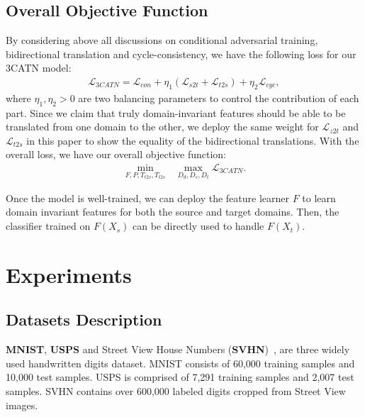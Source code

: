 \documentclass[sigconf]{acmart}
\begin{document}
\subsection{Overall Objective Function}
By considering above all discussions on conditional adversarial training, bidirectional translation and cycle-consistency, we have the following loss for our 3CATN model:
\begin{equation}
\label{eq:loss}
  \begin{array}{l}
 \mathcal{L}_{3CATN}= \mathcal{L}_{con}+\eta_1(\mathcal{L}_{s2t}+\mathcal{L}_{t2s})+\eta_2\mathcal{L}_{cyc},
\end{array} 
\end{equation} 
where $\eta_1, \eta_2>0$ are two balancing parameters to control the contribution of each part. Since we claim that truly domain-invariant features should be able to be translated from one domain to the other, we deploy the same weight for $\mathcal{L}_{z2t}$ and $\mathcal{L}_{t2s}$ in this paper to show the equality of the bidirectional translations. With the overall loss, we have our overall objective function:
\begin{equation}
\label{eq:objective}
  \begin{array}{l}
 \min\limits_{F,P,T_{t2s},T_{t2s}}~~~\max\limits_{D_d,D_s,D_t} \mathcal{L}_{3CATN}.
\end{array} 
\end{equation} 



Once the model is well-trained, we can deploy the feature learner $F$ to learn domain invariant features for both the source and target domains. Then, the classifier trained on $F(X_s)$ can be directly used to handle $F(X_t)$.

\section{Experiments}


\subsection{Datasets Description}
{\bf MNIST}, {\bf USPS} and Street View House Numbers ({\bf SVHN})~\cite{netzer2011reading}, are three widely used handwritten digits dataset. MNIST consists of 60,000 training samples and 10,000 test samples. USPS is comprised of 7,291 training samples and 2,007 test samples. SVHN contains over 600,000 labeled digits cropped from Street View images. 
\end{document}
